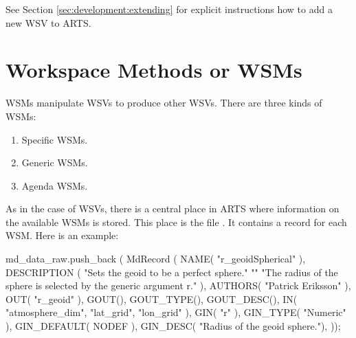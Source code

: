 \noindent
See Section \ref{sec:development:extending} for explicit
instructions how to add a new WSV to ARTS.

\section{Workspace Methods or WSMs}
\label{sec:agendas:wsms}

WSMs manipulate WSVs to produce other WSVs. There are three kinds of
WSMs:
\begin{enumerate}
\item Specific WSMs.
\item Generic WSMs.
\item Agenda WSMs.
\end{enumerate}
As in the case of WSVs, there is a central place in ARTS where
information on the available WSMs is stored. This place is the file
. It contains a record for each WSM. Here is an
example:

\begin{code}
md_data_raw.push_back
  ( MdRecord
    ( NAME( "r_geoidSpherical" ),
      DESCRIPTION
      (
       "Sets the geoid to be a perfect sphere.\n"
       "\n"
       "The radius of the sphere is selected by the generic argument r.\n"
      ),
      AUTHORS( "Patrick Eriksson" ),
      OUT( "r_geoid" ),
      GOUT(),
      GOUT_TYPE(),
      GOUT_DESC(),
      IN( "atmosphere_dim", "lat_grid", "lon_grid" ),
      GIN( "r" ),
      GIN_TYPE(    "Numeric" ),
      GIN_DEFAULT( NODEF     ),
      GIN_DESC( "Radius of the geoid sphere."),
      ));
\end{code}

